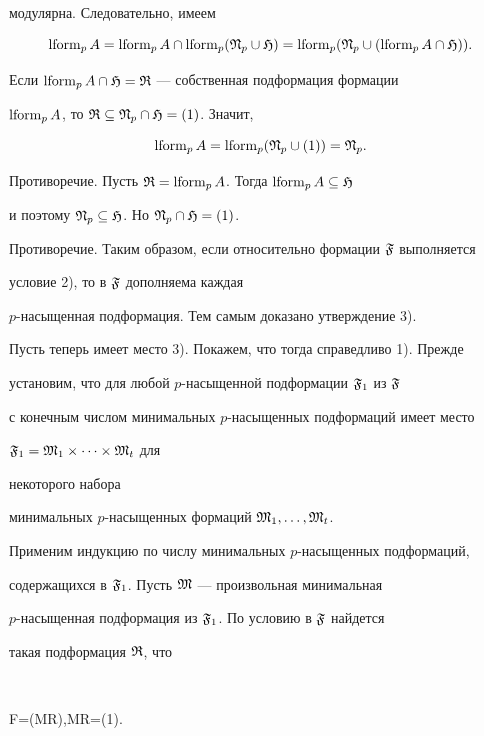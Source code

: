 \begin{pf}
модулярна. Следовательно, имеем 


$$ 


\lform_pA=\lform_pA\cap\lform_p(\frak N_p\cup\frak H)= 


\lform_p(\frak N_p\cup(\lform_pA\cap\frak H)). 


$$ 


Если $\operatorname{lform}_pA\cap\frak H=\frak R$ --- собственная подформация формации 


$\operatorname{lform}_pA$, то $\frak R\subseteq\frak N_p\cap\frak H=(1)$. Значит, 


$$ 


\lform_pA=\lform_p(\frak N_p\cup(1))=\frak N_p. 


$$ 


Противоречие. Пусть $\frak R=\operatorname{lform}_pA$. Тогда $\operatorname{lform}_pA\subseteq\frak H$ 


и поэтому $\frak N_p\subseteq\frak H$. Но $\frak N_p\cap\frak H=(1)$. 


Противоречие. Таким образом, если относительно формации $\frak F$ выполняется 


условие 2), то в $\frak F$ дополняема каждая 


$p$-насыщенная подформация. Тем самым доказано утверждение 3). 


 


Пусть теперь имеет место 3). Покажем, что тогда справедливо 1). Прежде 


установим, что для любой $p$-насыщенной подформации $\frak F_1$ из $\frak F$ 


с конечным числом минимальных $p$-насыщенных подформаций имеет место 


$\frak F_1=\frak M_1\times\dotsb\times\frak M_t$ для 


некоторого набора 


минимальных $p$-насыщенных формаций $\frak M_1,\dotsc,\frak M_t$. 


 


Применим индукцию по числу минимальных $p$-насыщенных подформаций, 


содержащихся в $\frak F_1$. Пусть $\frak M$ --- произвольная минимальная 


$p$-насыщенная подформация из $\frak F_1$. По условию в $\frak F$ найдется 


такая подформация $\frak R$, что 


$$ 


\frak F=\form(\frak M\cup\frak R),\quad\frak M\cap\frak R=(1). 



\end{pf}
